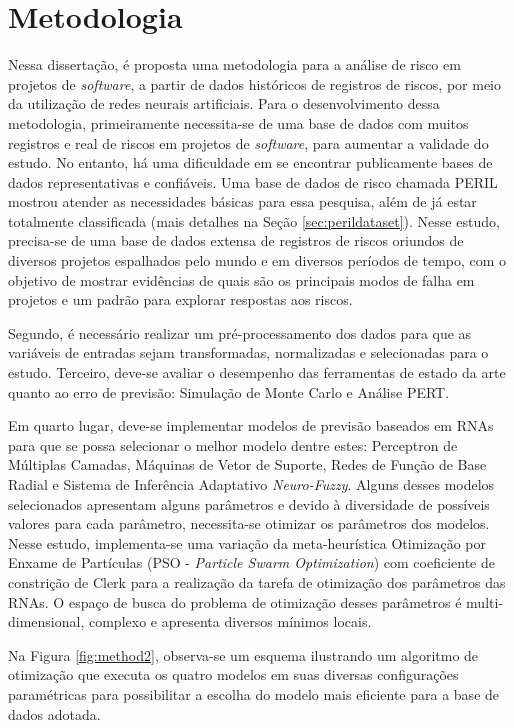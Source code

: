 \chapter{Metodologia}\label{cap:methodology}

Nessa dissertação, é proposta uma metodologia para a análise de risco em projetos de \textit{software}, a partir de dados históricos de registros de riscos, por meio da utilização de redes neurais artificiais. Para o desenvolvimento dessa metodologia, primeiramente necessita-se de uma base de dados com muitos registros e real de riscos em projetos de \textit{software}, para aumentar a validade do estudo. No entanto, há uma dificuldade em se encontrar publicamente bases de dados representativas e confiáveis. Uma base de dados de risco chamada PERIL \cite{kendrick2003identifying} mostrou atender as necessidades básicas para essa pesquisa, além de já estar totalmente classificada (mais detalhes na Seção \ref{sec:perildataset}). Nesse estudo, precisa-se de uma base de dados extensa de registros de riscos oriundos de diversos projetos espalhados pelo mundo e em diversos períodos de tempo, com o objetivo de mostrar evidências de quais são os principais modos de falha em projetos e um padrão para explorar respostas aos riscos.

Segundo, é necessário realizar um pré-processamento dos dados para que as variáveis de entradas sejam transformadas, normalizadas e selecionadas para o estudo. Terceiro, deve-se avaliar o desempenho das ferramentas de estado da arte quanto ao erro de previsão: Simulação de Monte Carlo e Análise PERT.

Em quarto lugar, deve-se implementar modelos de previsão baseados em RNAs para que se possa selecionar o melhor modelo dentre estes: Perceptron de Múltiplas Camadas, Máquinas de Vetor de Suporte, Redes de Função de Base Radial e Sistema de Inferência Adaptativo \textit{Neuro-Fuzzy}. Alguns desses modelos selecionados apresentam alguns parâmetros e devido à diversidade de possíveis valores para cada parâmetro, necessita-se otimizar os parâmetros dos modelos. Nesse estudo, implementa-se uma variação da meta-heurística Otimização por Enxame de Partículas (PSO - \textit{Particle Swarm Optimization}) com coeficiente de constrição de Clerk \cite{engelbrecht2007computational} para a realização da tarefa de otimização dos parâmetros das RNAs. O espaço de busca do problema de otimização desses parâmetros é multi-dimensional, complexo e apresenta diversos mínimos locais. 

Na Figura \ref{fig:method2}, observa-se um esquema ilustrando um algoritmo de otimização que executa os quatro modelos em suas diversas configurações paramétricas para possibilitar a escolha do modelo mais eficiente para a base de dados adotada.

